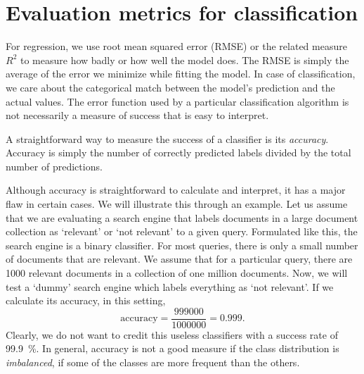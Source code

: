 \section{Evaluation metrics for classification}

For regression,
we use root mean squared error (RMSE)
or the related measure $R^{2}$ to measure
how badly or how well the model does.
The RMSE is simply the average of the error we minimize while fitting the model.
In case of classification,
we care about the categorical match between the model's prediction
and the actual values.
The error function used by a particular classification algorithm
is not necessarily a measure of success that is easy to interpret.

A straightforward way to measure the success of a classifier is
its \emph{accuracy}.
Accuracy is simply the number of correctly predicted labels
divided by the total number of predictions.

Although accuracy is straightforward to calculate and interpret,
it has a major flaw in certain cases.
We will illustrate this through an example.
Let us assume that we are evaluating a search engine
that labels documents in a large document collection
as `relevant' or `not relevant' to a given query.
Formulated like this, the search engine is a binary classifier.
For most queries, there is only a small number of documents that are relevant.
We assume that for a particular query,
there are \num{1000} relevant documents
in a collection of one million documents.
Now, we will test a `dummy' search engine
which labels everything as `not relevant'.
If we calculate its accuracy, in this setting,
\begin{equation*}
  \text{accuracy} = \frac{\num{999000}}{\num{1000000}} = 0.999 .
\end{equation*}
Clearly, we do not want to credit this useless classifiers
with a success rate of \SI{99.9}{\percent}.
In general, accuracy is not a good measure if the class distribution is
\emph{imbalanced}, if some of the classes are more frequent than the others.


